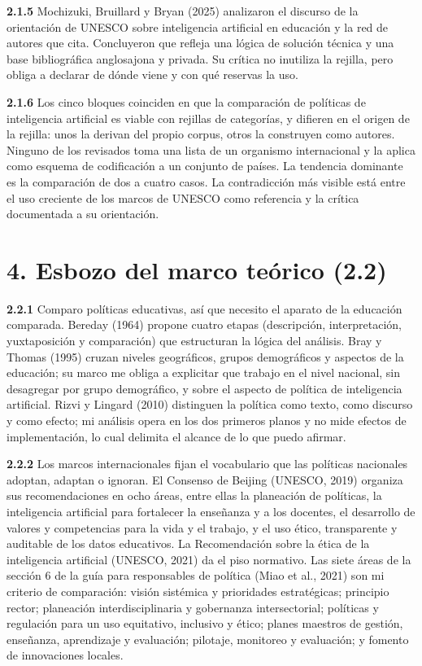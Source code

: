 \documentclass[12pt,letterpaper]{article}
\begin{document}
\textbf{2.1.5} Mochizuki, Bruillard y Bryan (2025) analizaron el discurso de la orientación de
UNESCO sobre inteligencia artificial en educación y la red de autores que cita. Concluyeron que
refleja una lógica de solución técnica y una base bibliográfica anglosajona y privada. Su crítica
no inutiliza la rejilla, pero obliga a declarar de dónde viene y con qué reservas la uso.

\textbf{2.1.6} Los cinco bloques coinciden en que la comparación de políticas de inteligencia
artificial es viable con rejillas de categorías, y difieren en el origen de la rejilla: unos la
derivan del propio corpus, otros la construyen como autores. Ninguno de los revisados toma una
lista de un organismo internacional y la aplica como esquema de codificación a un conjunto de
países. La tendencia dominante es la comparación de dos a cuatro casos. La contradicción más
visible está entre el uso creciente de los marcos de UNESCO como referencia y la crítica
documentada a su orientación.

\section*{4. Esbozo del marco teórico (2.2)}

\textbf{2.2.1} Comparo políticas educativas, así que necesito el aparato de la educación
comparada. Bereday (1964) propone cuatro etapas (descripción, interpretación, yuxtaposición y
comparación) que estructuran la lógica del análisis. Bray y Thomas (1995) cruzan niveles
geográficos, grupos demográficos y aspectos de la educación; su marco me obliga a explicitar que
trabajo en el nivel nacional, sin desagregar por grupo demográfico, y sobre el aspecto de
política de inteligencia artificial. Rizvi y Lingard (2010) distinguen la política como texto,
como discurso y como efecto; mi análisis opera en los dos primeros planos y no mide efectos de
implementación, lo cual delimita el alcance de lo que puedo afirmar.

\textbf{2.2.2} Los marcos internacionales fijan el vocabulario que las políticas nacionales
adoptan, adaptan o ignoran. El Consenso de Beijing (UNESCO, 2019) organiza sus recomendaciones en
ocho áreas, entre ellas la planeación de políticas, la inteligencia artificial para fortalecer la
enseñanza y a los docentes, el desarrollo de valores y competencias para la vida y el trabajo, y
el uso ético, transparente y auditable de los datos educativos. La Recomendación sobre la ética
de la inteligencia artificial (UNESCO, 2021) da el piso normativo. Las siete áreas de la sección
6 de la guía para responsables de política (Miao et al., 2021) son mi criterio de comparación:
visión sistémica y prioridades estratégicas; principio rector; planeación interdisciplinaria y
gobernanza intersectorial; políticas y regulación para un uso equitativo, inclusivo y ético;
planes maestros de gestión, enseñanza, aprendizaje y evaluación; pilotaje, monitoreo y
evaluación; y fomento de innovaciones locales.
\end{document}
